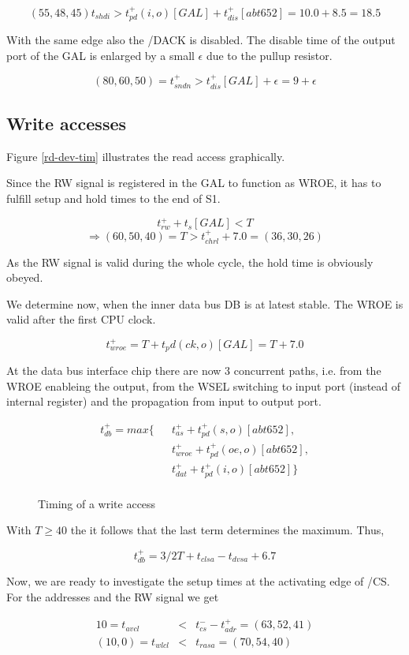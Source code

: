 \documentclass[12pt]{article}
\newcommand{\myfig}[4]{%
  \begin{figure}[htbp] \begin{center}%
  \makebox{\epsfysize=#2 \epsfbox{#1}} \caption{\label{#3} #4}%
  \end{center} \end{figure}}
\newcommand{\beqn}{\begin{eqnarray*}}
\newcommand{\eeqn}{\end{eqnarray*}}
\begin{document}
\[ (55,48,45) t_{shdi} > t_{pd}^+(i,o)[GAL] + t_{dis}^+[abt652] = 
10.0 + 8.5 = 18.5 \]

With the same edge also the /DACK is disabled. The disable time of the
output port of the GAL is enlarged by a small $\epsilon$ due to the
pullup resistor.

\[ (80,60,50) = t_{sndn}^+ > t_{dis}^+[GAL] + \epsilon = 9 + \epsilon \]


\subsection{Write accesses}

Figure \ref{rd-dev-tim} illustrates the read access graphically.

Since the RW signal is registered in the GAL to function as WROE, it
has to fulfill setup and hold times to the end of S1.

\[ t_{rw}^+ + t_s[GAL] < T \]
\[ \Rightarrow (60,50,40) = T > t_{chrl}^+ + 7.0 = (36,30,26) \]

As the RW signal is valid during the whole cycle, the hold time is
obviously obeyed.

We determine now, when the inner data bus DB is at latest stable. The
WROE is valid after the first CPU clock.

\[ t_{wroe}^+ = T + t_pd(ck,o)[GAL] = T + 7.0 \]

At the data bus interface chip there are now 3 concurrent paths,
i.e. from the WROE enableing the output, from the WSEL switching to
input port (instead of internal register) and the propagation from
input to output port.

\beqn
t_{db}^+ = max \{ && t_{as}^+ + t_{pd}^+(s,o)[abt652],  \\
&& t_{wroe}^+ + t_{pd}^+(oe,o)[abt652],\\
&& t_{dat}^+ + t_{pd}^+(i,o)[abt652] \} \\
\eeqn

\myfig{wr-dev-tim.eps}{100mm}{wr-dev-tim}{Timing of a write access}

With $T \ge 40$ the it follows that the last term determines the
maximum. Thus,

\[ t_{db}^+ = 3/2 T + t_{clsa} - t_{dvsa} + 6.7 \]

Now, we are ready to investigate the setup times at the activating
edge of /CS. For the addresses and the RW signal we get

\beqn
10 = t_{avcl} &<& t_{cs}^- - t_{adr}^+ = (63,52,41)\\
(10,0)= t_{wlcl} &<& t_{rasa} = (70,54,40)\\
\eeqn
\end{document}
